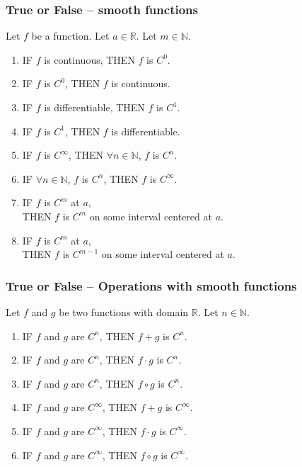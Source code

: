 \begin{frame}[t]
	\frametitle{True or False -- smooth functions}

	Let $f$ be a function. Let $a \in \mathbb{R}$. Let $m \in \mathbb{N}$.
	\vspace{.2cm}
	\begin{enumerate}
		\item IF $f$ is continuous, \; THEN $f$ is $C^{0}$.

		\item IF $f$ is $C^{0}$, \; THEN $f$ is continuous.

		\item IF $f$ is differentiable, \; THEN $f$ is $C^{1}$.

		\item IF $f$ is $C^{1}$, \; THEN $f$ is differentiable.

		\item IF $f$ is $C^{\infty}$, \; THEN $\forall n \in \mathbb{N}$, $f$ is $C^{n}$.

		\item IF $\forall n \in \mathbb{N}$, $f$ is $C^{n}$, \; THEN $f$ is $C^{\infty}$.

		\item IF $f$ is $C^{m}$ at $a$, \\ \; THEN $f$ is $C^{m}$ on some interval
			centered at $a$.

		\item IF $f$ is $C^{m}$ at $a$, \\ \; THEN $f$ is $C^{m-1}$ on some interval
			centered at $a$.
	\end{enumerate}
\end{frame}

\begin{frame}[t]
	\frametitle{True or False -- Operations with smooth functions}

	Let $f$ and $g$ be two functions with domain $\mathbb{R}$. Let $n \in \mathbb{N}$.
	\vspace{.2cm}

	\begin{enumerate}
		\item IF $f$ and $g$ are $C^{n}$, \; THEN $f + g$ is $C^{n}$.

		\item IF $f$ and $g$ are $C^{n}$, \; THEN $f \cdot g$ is $C^{n}$.

		\item IF $f$ and $g$ are $C^{n}$, \; THEN $f \circ g$ is $C^{n}$.

		\item IF $f$ and $g$ are $C^{\infty}$, \; THEN $f + g$ is $C^{\infty}$.

		\item IF $f$ and $g$ are $C^{\infty}$, \; THEN $f \cdot g$ is $C^{\infty}$.

		\item IF $f$ and $g$ are $C^{\infty}$, \; THEN $f \circ g$ is $C^{\infty}$.
	\end{enumerate}
\end{frame}

